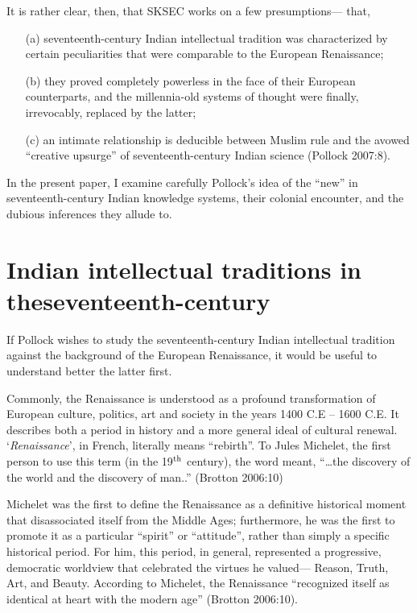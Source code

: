 It is rather clear, then, that SKSEC works on a few presumptions— that, 
\begin{itemize}
\itemsep=1pt
\item[(a)] seventeenth-century Indian intellectual tradition was characterized by certain peculiarities that were comparable to the European Renaissance;

\item[(b)] they proved completely powerless in the face of their European counterparts, and the millennia-old systems of thought were finally, irrevocably, replaced by the latter; 

\item[(c)] an intimate relationship is deducible between Muslim rule and the avowed “creative upsurge” of seventeenth-century Indian science (Pollock 2007:8).
\end{itemize}

In the present paper, I examine carefully Pollock’s idea of the “new” in seventeenth-century Indian knowledge systems, their colonial encounter, and the dubious inferences they allude to.

\newpage

\section{Indian intellectual traditions in the\newline seventeenth-century}

If Pollock wishes to study the seventeenth-century Indian intellectual tradition against the background of the European Renaissance, it would be useful to understand better the latter first. 

Commonly, the Renaissance is understood as a profound transformation of European culture, politics, art and society in the years 1400 C.E – 1600 C.E.  It describes both a period in history and a more general ideal of cultural renewal. ‘{\em Renaissance}’, in French, literally means “rebirth”. To Jules Michelet, the first person to use this term (in the 19$^{\rm th}$ century), the word meant, “…the discovery of the world and the discovery of man..” (Brotton 2006:10) 

Michelet was the first to define the Renaissance as a definitive historical moment that disassociated itself from the Middle Ages; furthermore, he was the first to promote it as a particular “spirit” or “attitude”, rather than simply a specific historical period. For him, this period, in general, represented a progressive, democratic worldview that celebrated the virtues he valued— Reason, Truth, Art, and Beauty. According to Michelet, the Renaissance “recognized itself as identical at heart with the modern age” (Brotton 2006:10).

